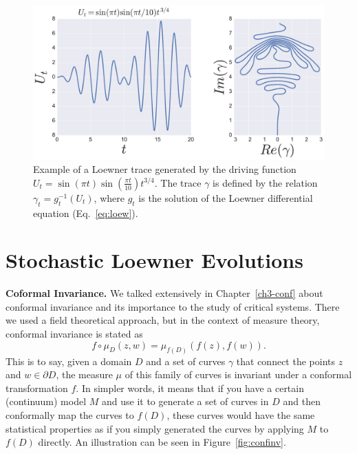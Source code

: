 \begin{figure}
\begin{center}
    \includegraphics[scale=0.4]{chapters/ch4-sle/figs/leexample}
\end{center}
\caption{Example of a Loewner trace generated by the driving function
    $U_t=\sin(\pi t)\sin(\frac{\pi t}{10})t^{3/4}$. The trace $\gamma$ is
    defined by the relation $\gamma_t = g_t^{-1}(U_t)$, where $g_t$ is the
    solution of the Loewner differential equation (Eq.~\ref{eq:loew}).}
\label{fig:leexample}
\end{figure}

\section{Stochastic Loewner Evolutions}
\label{sec:le}

\textbf{Coformal Invariance.}
We talked extensively in Chapter~\ref{ch3-conf} about conformal invariance and
its importance to the study of critical systems. There we used a field
theoretical approach, but in the context of measure theory, conformal
invariance is stated as
\begin{equation}
    \newcommand{\pp}[1]{\left(#1\right)}
    f\circ\mu_D\pp{z,w} = \mu_{f(D)}\pp{f\pp{z}, f\pp{w}}.
\end{equation}
This is to say, given a domain $D$ and a set of curves $\gamma$ that connect
the points $z$ and $w\in\partial D$, the measure $\mu$ of this family of curves
is invariant under a conformal transformation $f$. In simpler words, it means
that if you have a certain (continuum) model $M$ and use it to generate a set
of curves in $D$ and then conformally map the curves to $f(D)$, these
curves would have the same statistical properties as if you simply generated the
curves by applying $M$ to $f(D)$ directly. An illustration can be seen in
Figure~\ref{fig:confinv}.


